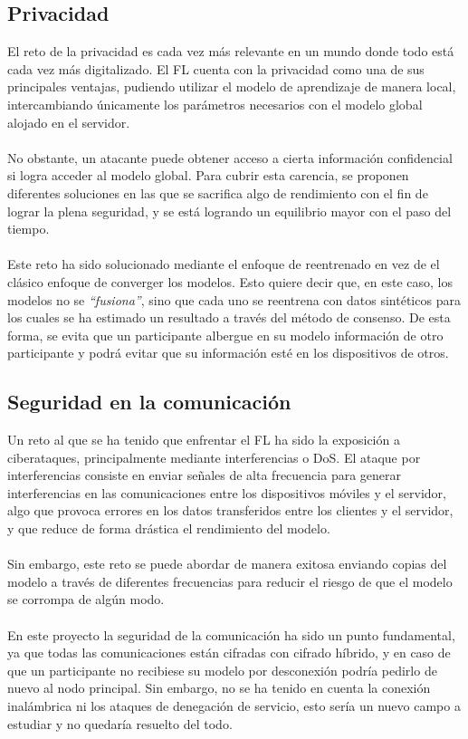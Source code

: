 \subsection{Privacidad}
El reto de la privacidad es cada vez más relevante en un mundo donde todo está cada vez más digitalizado. El FL cuenta con la privacidad como una de sus principales ventajas, pudiendo utilizar el modelo de aprendizaje de manera local, intercambiando únicamente los parámetros necesarios con el modelo global alojado en el servidor. 
\\ \\
No obstante, un atacante puede obtener acceso a cierta información confidencial si logra acceder al modelo global. Para cubrir esta carencia, se proponen diferentes soluciones en las que se sacrifica algo de rendimiento con el fin de lograr la plena seguridad, y se está logrando un equilibrio mayor con el paso del tiempo.
\\ \\
Este reto ha sido solucionado mediante el enfoque de reentrenado en vez de el clásico enfoque de converger los modelos. Esto quiere decir que, en este caso, los modelos no se \textit{``fusiona''}, sino que cada uno se reentrena con datos sintéticos para los cuales se ha estimado un resultado a través del método de consenso. De esta forma, se evita que un participante albergue en su modelo información de otro participante y podrá evitar que su información esté en los dispositivos de otros.

\subsection{Seguridad en la comunicación}
Un reto al que se ha tenido que enfrentar el FL ha sido la exposición a ciberataques, principalmente mediante interferencias o DoS. El ataque por interferencias consiste en enviar señales de alta frecuencia para generar interferencias en las comunicaciones entre los dispositivos móviles y el servidor, algo que provoca errores en los datos transferidos entre los clientes y el servidor, y que reduce de forma drástica el rendimiento del modelo. 
\\ \\
Sin embargo, este reto se puede abordar de manera exitosa enviando copias del modelo a través de diferentes frecuencias para reducir el riesgo de que el modelo se corrompa de algún modo.
\\ \\
En este proyecto la seguridad de la comunicación ha sido un punto fundamental, ya que todas las comunicaciones están cifradas con cifrado híbrido, y en caso de que un participante no recibiese su modelo por desconexión podría pedirlo de nuevo al nodo principal. Sin embargo, no se ha tenido en cuenta la conexión inalámbrica ni los ataques de denegación de servicio, esto sería un nuevo campo a estudiar y no quedaría resuelto del todo.  

